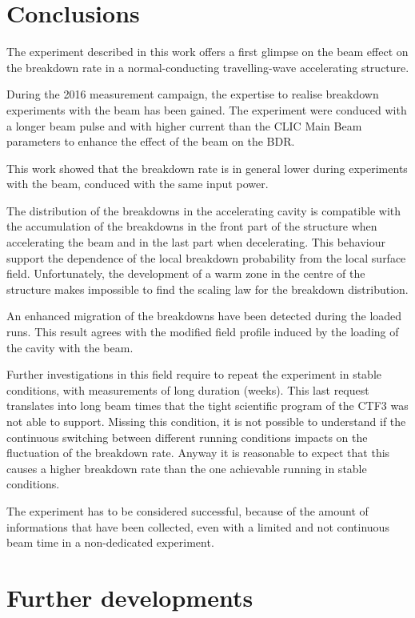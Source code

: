\section{Conclusions}

The experiment described in this work offers a first glimpse on the beam effect on the breakdown rate in a normal-conducting travelling-wave accelerating structure.

During the 2016 measurement campaign, the expertise to realise breakdown experiments with the beam has been gained. The experiment were conduced with a longer beam pulse and with higher current than the CLIC Main Beam parameters to enhance the effect of the beam on the BDR.

This work showed that the breakdown rate is in general lower during experiments with the beam, conduced with the same input power. 

The distribution of the breakdowns in the accelerating cavity is compatible with the accumulation of the breakdowns in the front part of the structure when accelerating the beam and in the last part when decelerating. This behaviour support the dependence of the local breakdown probability from the local surface field. Unfortunately, the development of a warm zone in the centre of the structure makes impossible to find the scaling law for the breakdown distribution. 

An enhanced migration of the breakdowns have been detected during the loaded runs. This result agrees with the modified field profile induced by the loading of the cavity with the beam.

Further investigations in this field require to repeat the experiment in stable conditions, with measurements of long duration (weeks). This last request translates into long beam times that the tight scientific program of the CTF3 was not able to support. Missing this condition, it is not possible to understand if the continuous switching between different running conditions impacts on the fluctuation of the breakdown rate. Anyway it is reasonable to expect that this causes a higher breakdown rate than the one achievable running in stable conditions. 

The experiment has to be considered successful, because of the amount of informations that have been collected, even with a limited and not continuous beam time in a non-dedicated experiment.



\section[Further developments]{Further developments}

